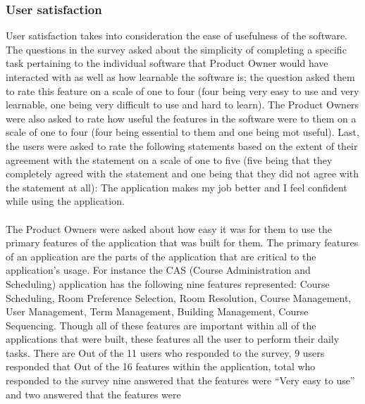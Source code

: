 \subsubsection{User satisfaction}
User satisfaction takes into consideration the ease of usefulness of the software. The questions in the survey asked about the simplicity of completing a specific task pertaining to the individual software that Product Owner would have interacted with as well as how learnable the software is; the question asked them to rate this feature on a scale of one to four (four being very easy to use and very learnable, one being very difficult to use and hard to learn). The Product Owners were also asked to rate how useful the features in the software were to them on a scale of one to four (four being essential to them and one being mot useful). Last, the users were asked to rate the following statements based on the extent of their agreement with the statement on a scale of one to five (five being that they completely agreed with the statement and one being that they did not agree with the statement at all): The application makes my job better and I feel confident while using the application.

\paragraph{} The Product Owners were asked about how easy it was for them to use the primary features of the application that was built for them. The primary features of an application are the parts of the application that are critical to the application's usage. For instance the CAS (Course Administration and Scheduling) application has the following nine features represented: Course Scheduling, Room Preference Selection, Room Resolution, Course Management, User Management, Term Management, Building Management, Course Sequencing. Though all of these features are important within all of the applications that were built, these features all the user to perform their daily tasks. There are Out of the 11 users who responded to the survey, 9 users responded that Out of the 16 features within the application, total who responded to the survey nine answered that the features were ``Very easy to use'' and two answered that the features were

